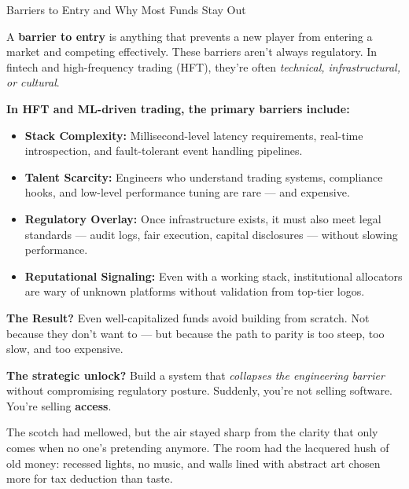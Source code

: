 \begin{TechnicalSidebar}{Barriers to Entry and Why Most Funds Stay Out}

  A \textbf{barrier to entry} is anything that prevents a new player from entering a market and competing effectively.  
  These barriers aren’t always regulatory. In fintech and high-frequency trading (HFT), they’re often 
  \textit{technical, infrastructural, or cultural}.
  
  \medskip
  
  \textbf{In HFT and ML-driven trading, the primary barriers include:}

  \medskip
  
  \begin{itemize}
    \item \textbf{Stack Complexity:}  
    Millisecond-level latency requirements, real-time introspection, and fault-tolerant event handling pipelines.
  
    \item \textbf{Talent Scarcity:}  
    Engineers who understand trading systems, compliance hooks, and low-level performance tuning are rare — and expensive.
  
    \item \textbf{Regulatory Overlay:}  
    Once infrastructure exists, it must also meet legal standards — audit logs, fair execution, capital disclosures — without slowing performance.
  
    \item \textbf{Reputational Signaling:}  
    Even with a working stack, institutional allocators are wary of unknown platforms without validation from top-tier logos.
  \end{itemize}
  
  \medskip
  
  \textbf{The Result?}  
  Even well-capitalized funds avoid building from scratch.  
  Not because they don’t want to — but because the path to parity is too steep, too slow, and too expensive.
  
  \medskip
  
  \textbf{The strategic unlock?}  
  Build a system that \textit{collapses the engineering barrier} without compromising regulatory posture.  
  Suddenly, you’re not selling software. You’re selling \textbf{access}.
  
\end{TechnicalSidebar}


\medskip

The scotch had mellowed, but the air stayed sharp from the clarity that only comes when no one’s 
pretending anymore. The room had the lacquered hush of old money: recessed lights, no music, and walls lined with abstract 
art chosen more for tax deduction than taste.

